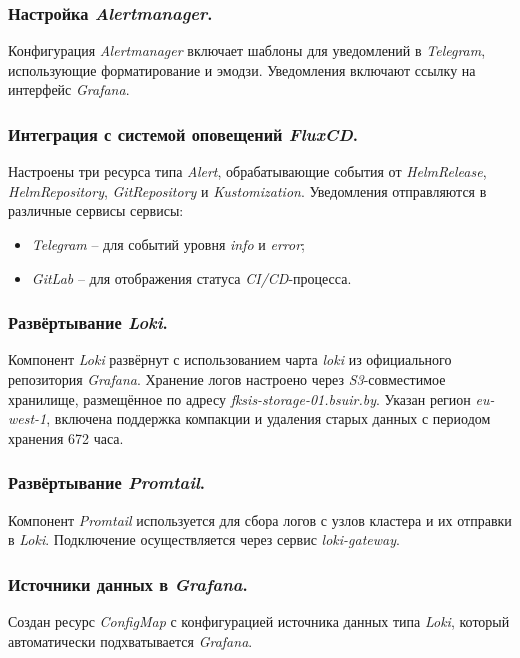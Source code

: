 \subsubsection{Настройка \textit{Alertmanager}.} Конфигурация \textit{Alertmanager} включает шаблоны для уведомлений в \textit{Telegram}, использующие форматирование и эмодзи. Уведомления включают ссылку на интерфейс \textit{Grafana}.

\subsubsection{Интеграция с системой оповещений \textit{FluxCD}.} Настроены три ресурса типа \textit{Alert}, обрабатывающие события от \textit{HelmRelease}, \textit{HelmRepository}, \textit{GitRepository} и \textit{Kustomization}. Уведомления отправляются в различные сервисы сервисы:

\begin{itemize}
    \item \textit{Telegram} -- для событий уровня \textit{info} и \textit{error};
    \item \textit{GitLab} -- для отображения статуса \textit{CI/CD}-процесса.
\end{itemize}

\subsubsection{Развёртывание \textit{Loki}.} Компонент \textit{Loki} развёрнут с использованием чарта \textit{loki} из официального репозитория \textit{Grafana}. Хранение логов настроено через \textit{S3}-совместимое хранилище, размещённое по адресу \textit{fksis-storage-01.bsuir.by}. Указан регион \textit{eu-west-1}, включена поддержка компакции и удаления старых данных с периодом хранения 672 часа.

\subsubsection{Развёртывание \textit{Promtail}.} Компонент \textit{Promtail} используется для сбора логов с узлов кластера и их отправки в \textit{Loki}. Подключение осуществляется через сервис \textit{loki-gateway}.

\subsubsection{Источники данных в \textit{Grafana}.} Создан ресурс \textit{ConfigMap} с конфигурацией источника данных типа \textit{Loki}, который автоматически подхватывается \textit{Grafana}.

